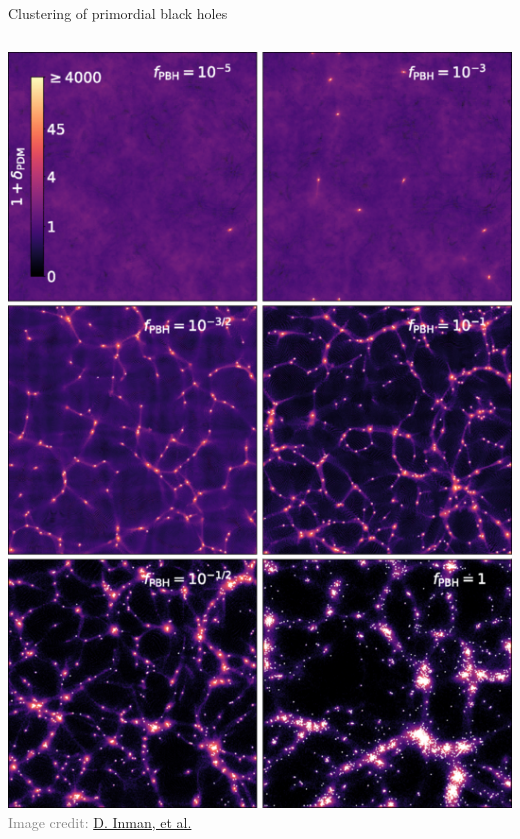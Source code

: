 \begin{frame}{Clustering of primordial black holes}
\begin{columns}
\begin{column}{0.5\linewidth}
{	\includegraphics[height=.86\textheight]{img/PBH_Nbody}\\
	\textcolor{gray}{\fontsize{5.5}{10}\selectfont Image credit: \href{https://journals.aps.org/prd/abstract/10.1103/PhysRevD.100.083528}{D. Inman, et al.}}
}
\end{column}
\end{columns}
\end{frame}

